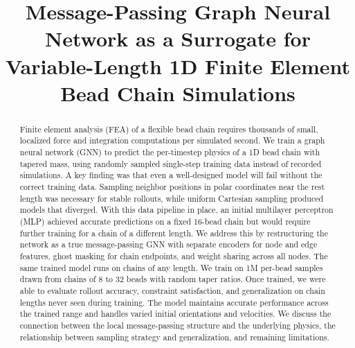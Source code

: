 \documentclass[conference]{IEEEtran}
\begin{document}
\title{Message-Passing Graph Neural Network as a Surrogate for Variable-Length 1D Finite Element Bead Chain Simulations}

\author{
\and
{}
}

\maketitle

\begin{abstract}
Finite element analysis (FEA) of a flexible bead chain requires thousands of small, localized force and integration computations per simulated second. We train a graph neural network (GNN) to predict the per-timestep physics of a 1D bead chain with tapered mass, using randomly sampled single-step training data instead of recorded simulations. A key finding was that even a well-designed model will fail without the correct training data. Sampling neighbor positions in polar coordinates near the rest length was necessary for stable rollouts, while uniform Cartesian sampling produced models that diverged. With this data pipeline in place, an initial multilayer perceptron (MLP) achieved accurate predictions on a fixed 16-bead chain but would require further training for a chain of a different length. We address this by restructuring the network as a true message-passing GNN with separate encoders for node and edge features, ghost masking for chain endpoints, and weight sharing across all nodes. The same trained model runs on chains of any length. We train on 1M per-bead samples drawn from chains of 8 to 32 beads with random taper ratios. Once trained, we were able to evaluate rollout accuracy, constraint satisfaction, and generalization on chain lengths never seen during training. The model maintains accurate performance across the trained range and handles varied initial orientations and velocities. We discuss the connection between the local message-passing structure and the underlying physics, the relationship between sampling strategy and generalization, and remaining limitations.
\end{abstract}
\end{document}
